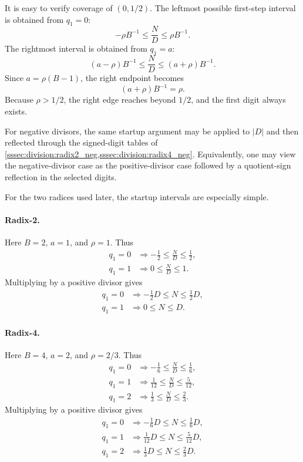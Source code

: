 \documentclass[11pt]{article}
\numberwithin{equation}{section}
\begin{document}
It is easy to verify coverage of $(0,1/2)$.
The leftmost possible first-step interval is obtained from $q_1=0$:
\[
  -\rho B^{-1} \le \frac{N}{D} \le \rho B^{-1}.
\]
The rightmost interval is obtained from $q_1=a$:
\[
  (a-\rho)B^{-1} \le \frac{N}{D} \le (a+\rho)B^{-1}.
\]
Since $a = \rho(B-1)$, the right endpoint becomes
\[
  (a+\rho)B^{-1} = \rho.
\]
Because $\rho > 1/2$, the right edge reaches beyond $1/2$, and the first digit always exists.

For negative divisors, the same startup argument may be applied to $|D|$ and then reflected through
the signed-digit tables of \cref{sssec:division:radix2_neg,sssec:division:radix4_neg}.
Equivalently, one may view the negative-divisor case as the positive-divisor case followed by a
quotient-sign reflection in the selected digits.

For the two radices used later, the startup intervals are especially simple.

\paragraph{Radix-2.}
Here $B=2$, $a=1$, and $\rho=1$.
Thus
\begin{align*}
  q_1 = 0 &\Longrightarrow -\frac{1}{2} \le \frac{N}{D} \le \frac{1}{2}, \\
  q_1 = 1 &\Longrightarrow 0 \le \frac{N}{D} \le 1.
\end{align*}
Multiplying by a positive divisor gives
\begin{align*}
  q_1 = 0 &\Longrightarrow -\frac{1}{2}D \le N \le \frac{1}{2}D, \\
  q_1 = 1 &\Longrightarrow 0 \le N \le D.
\end{align*}

\paragraph{Radix-4.}
Here $B=4$, $a=2$, and $\rho=2/3$.
Thus
\begin{align*}
  q_1 = 0 &\Longrightarrow -\frac{1}{6} \le \frac{N}{D} \le \frac{1}{6}, \\
  q_1 = 1 &\Longrightarrow \frac{1}{12} \le \frac{N}{D} \le \frac{5}{12}, \\
  q_1 = 2 &\Longrightarrow \frac{1}{3} \le \frac{N}{D} \le \frac{2}{3}.
\end{align*}
Multiplying by a positive divisor gives
\begin{align*}
  q_1 = 0 &\Longrightarrow -\frac{1}{6}D \le N \le \frac{1}{6}D, \\
  q_1 = 1 &\Longrightarrow \frac{1}{12}D \le N \le \frac{5}{12}D, \\
  q_1 = 2 &\Longrightarrow \frac{1}{3}D \le N \le \frac{2}{3}D.
\end{align*}
\end{document}
